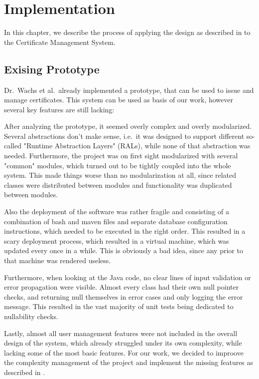 \chapter{Implementation}\label{ch:implementation}
In this chapter, we describe the process of applying the design as described in  to the
Certificate Management System.

\section{Exising Prototype}\label{sec:exisingPrototype}
Dr.\ Wachs et al.\ already implemented a prototype, that can be used to issue and manage certificates.
This system can be used as basis of our work, however several key features are still lacking:

After analyzing the prototype, it seemed overly complex and overly modularized.
Several abstractions don't make sense, i.e.\ it was designed to support different so-called "Runtime Abstraction
Layers" (RALs), while none of that abstraction was needed.
Furthermore, the project was on first sight modularized with several "common" modules, which turned out to be tightly
coupled into the whole system.
This made things worse than no modularization at all, since related classes were distributed between modules and
functionality was duplicated between modules.

Also the deployment of the software was rather fragile and consisting of a combination of bash and maven files and
separate database configuration instructions, which needed to be executed in the right order.
This resulted in a scary deployment process, which resulted in a virtual machine, which was updated every once in a
while.
This is obviously a bad idea, since any  prior to that machine was rendered useless.

Furthermore, when looking at the Java code, no clear lines of input validation or error propagation were visible.
Almost every class had their own null pointer checks, and returning null themselves in error cases and only logging the
error message.
This resulted in the vast majority of unit tests being dedicated to nullability checks.

Lastly, almost all user management features were not included in the overall design of the system, which already
struggled under its own complexity, while lacking some of the most basic features.
For our work, we decided to improove the complexity management of the project and implement the missing features as
described in .

